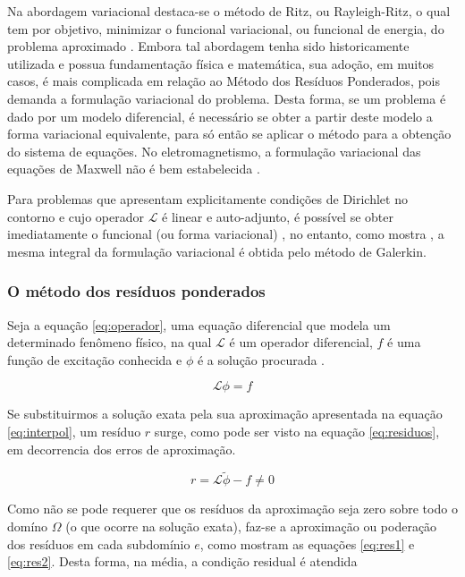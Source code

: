 \documentclass[
    12pt,               %
    openright,          %
    oneside,
    a4paper,            %
    english,            %
    french,             %
    spanish,            %
    brazil              %
    ]{abntex2}
\begin{document}
Na abordagem variacional destaca-se o método de Ritz, ou Rayleigh-Ritz, o qual tem por objetivo, minimizar o funcional variacional, ou funcional de energia, do problema aproximado \cite[p. 24]{volakis}. Embora tal abordagem tenha sido historicamente utilizada e possua fundamentação física e matemática, sua adoção, em muitos casos, é mais complicada em relação ao Método dos Resíduos Ponderados, pois demanda a formulação variacional do problema. Desta forma, se um problema é dado por um modelo diferencial, é necessário se obter a partir deste modelo a forma variacional equivalente, para só então se aplicar o método para a obtenção do sistema de equações. No eletromagnetismo, a formulação variacional das equações de Maxwell não é bem estabelecida \cite[p. 211]{jin}.

Para problemas que apresentam explicitamente condições de Dirichlet no contorno e cujo operador $\mathcal{L}$ é linear e auto-adjunto, é possível se obter imediatamente o funcional (ou forma variacional) \cite[p. 81]{zien}, no entanto, como mostra \cite[p. 29]{volakis}, a mesma integral da formulação variacional é obtida pelo método de Galerkin.

\subsubsection{O método dos resíduos ponderados}

Seja a equação \ref{eq:operador}, uma equação diferencial que modela um determinado fenômeno físico, na qual $\mathcal{L}$ é um operador diferencial, $f$ é uma função de excitação conhecida e $\phi$ é a solução procurada \cite[p. 20]{jin}\cite[p. 24]{volakis}.

 \begin{equation}
    \label{eq:operador}
    \mathcal{L} \phi = f
 \end{equation}
 
 Se substituirmos a solução exata pela sua aproximação apresentada na equação \ref{eq:interpol}, um resíduo $r$ surge, como pode ser visto na equação \ref{eq:residuos}, em decorrencia dos erros de aproximação.
 
  \begin{equation}
    \label{eq:residuos}
    r = \mathcal{L} \tilde{\phi} - f \neq 0
  \end{equation}

Como não se pode requerer que os resíduos da aproximação seja zero sobre todo o domíno $\Omega$ (o que ocorre na solução exata), faz-se a aproximação ou poderação dos resíduos em cada subdomínio $e$, como mostram as equações \ref{eq:res1} e \ref{eq:res2}. Desta forma, na média, a condição residual é atendida \cite[p. 28]{volakis}
\end{document}

